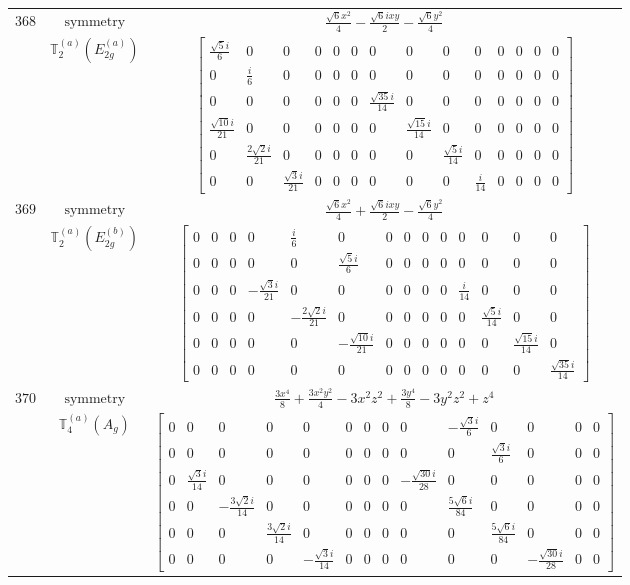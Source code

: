 \documentclass[fleqn,8pt,landscape]{jsarticle}
\begin{document}
\begin{longtable}{ccc}
$ 368 $ & $ \text{symmetry} $ & $ \frac{\sqrt{6} x^{2}}{4} - \frac{\sqrt{6} i x y}{2} - \frac{\sqrt{6} y^{2}}{4} $ \\
$  $ & $ \mathbb{T}_{2}^{(a)}(E_{2g}^{(a)}) $ & $ \begin{bmatrix} \frac{\sqrt{5} i}{6} & 0 & 0 & 0 & 0 & 0 & 0 & 0 & 0 & 0 & 0 & 0 & 0 & 0 \\ 0 & \frac{i}{6} & 0 & 0 & 0 & 0 & 0 & 0 & 0 & 0 & 0 & 0 & 0 & 0 \\ 0 & 0 & 0 & 0 & 0 & 0 & \frac{\sqrt{35} i}{14} & 0 & 0 & 0 & 0 & 0 & 0 & 0 \\ \frac{\sqrt{10} i}{21} & 0 & 0 & 0 & 0 & 0 & 0 & \frac{\sqrt{15} i}{14} & 0 & 0 & 0 & 0 & 0 & 0 \\ 0 & \frac{2 \sqrt{2} i}{21} & 0 & 0 & 0 & 0 & 0 & 0 & \frac{\sqrt{5} i}{14} & 0 & 0 & 0 & 0 & 0 \\ 0 & 0 & \frac{\sqrt{3} i}{21} & 0 & 0 & 0 & 0 & 0 & 0 & \frac{i}{14} & 0 & 0 & 0 & 0 \end{bmatrix} $ \\ \hline
$ 369 $ & $ \text{symmetry} $ & $ \frac{\sqrt{6} x^{2}}{4} + \frac{\sqrt{6} i x y}{2} - \frac{\sqrt{6} y^{2}}{4} $ \\
$  $ & $ \mathbb{T}_{2}^{(a)}(E_{2g}^{(b)}) $ & $ \begin{bmatrix} 0 & 0 & 0 & 0 & \frac{i}{6} & 0 & 0 & 0 & 0 & 0 & 0 & 0 & 0 & 0 \\ 0 & 0 & 0 & 0 & 0 & \frac{\sqrt{5} i}{6} & 0 & 0 & 0 & 0 & 0 & 0 & 0 & 0 \\ 0 & 0 & 0 & - \frac{\sqrt{3} i}{21} & 0 & 0 & 0 & 0 & 0 & 0 & \frac{i}{14} & 0 & 0 & 0 \\ 0 & 0 & 0 & 0 & - \frac{2 \sqrt{2} i}{21} & 0 & 0 & 0 & 0 & 0 & 0 & \frac{\sqrt{5} i}{14} & 0 & 0 \\ 0 & 0 & 0 & 0 & 0 & - \frac{\sqrt{10} i}{21} & 0 & 0 & 0 & 0 & 0 & 0 & \frac{\sqrt{15} i}{14} & 0 \\ 0 & 0 & 0 & 0 & 0 & 0 & 0 & 0 & 0 & 0 & 0 & 0 & 0 & \frac{\sqrt{35} i}{14} \end{bmatrix} $ \\ \hline
$ 370 $ & $ \text{symmetry} $ & $ \frac{3 x^{4}}{8} + \frac{3 x^{2} y^{2}}{4} - 3 x^{2} z^{2} + \frac{3 y^{4}}{8} - 3 y^{2} z^{2} + z^{4} $ \\
$  $ & $ \mathbb{T}_{4}^{(a)}(A_{g}) $ & $ \begin{bmatrix} 0 & 0 & 0 & 0 & 0 & 0 & 0 & 0 & 0 & - \frac{\sqrt{3} i}{6} & 0 & 0 & 0 & 0 \\ 0 & 0 & 0 & 0 & 0 & 0 & 0 & 0 & 0 & 0 & \frac{\sqrt{3} i}{6} & 0 & 0 & 0 \\ 0 & \frac{\sqrt{3} i}{14} & 0 & 0 & 0 & 0 & 0 & 0 & - \frac{\sqrt{30} i}{28} & 0 & 0 & 0 & 0 & 0 \\ 0 & 0 & - \frac{3 \sqrt{2} i}{14} & 0 & 0 & 0 & 0 & 0 & 0 & \frac{5 \sqrt{6} i}{84} & 0 & 0 & 0 & 0 \\ 0 & 0 & 0 & \frac{3 \sqrt{2} i}{14} & 0 & 0 & 0 & 0 & 0 & 0 & \frac{5 \sqrt{6} i}{84} & 0 & 0 & 0 \\ 0 & 0 & 0 & 0 & - \frac{\sqrt{3} i}{14} & 0 & 0 & 0 & 0 & 0 & 0 & - \frac{\sqrt{30} i}{28} & 0 & 0 \end{bmatrix} $ \\ \hline

\end{longtable}
\end{document}
